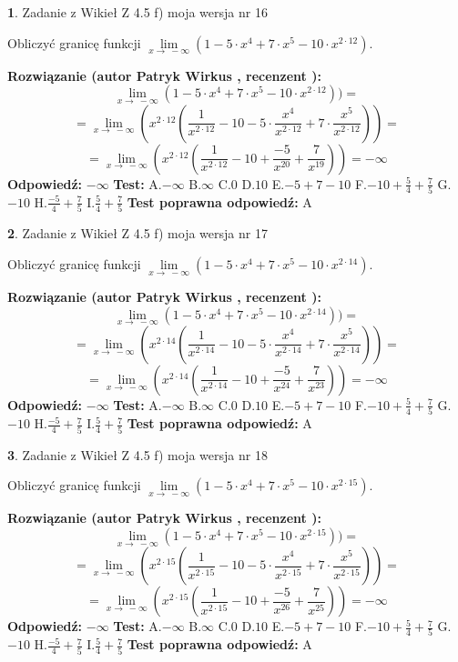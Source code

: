 \documentclass[12pt, a4paper]{article}
\theoremstyle{definition} %
\newtheorem{zad}{}
\newcommand{\zadStart}[1]{\begin{zad}#1\newline}
\newcommand{\zadStop}{\end{zad}}
\newcommand{\rozwStart}[2]{\noindent \textbf{Rozwiązanie (autor #1 , recenzent #2): }\newline}
\newcommand{\rozwStop}{\newline}
\newcommand{\odpStart}{\noindent \textbf{Odpowiedź:}\newline}
\newcommand{\odpStop}{\newline}
\newcommand{\testStart}{\noindent \textbf{Test:}\newline}
\newcommand{\testStop}{\newline}
\newcommand{\kluczStart}{\noindent \textbf{Test poprawna odpowiedź:}\newline}
\newcommand{\kluczStop}{\newline}
\begin{document}
\zadStart{Zadanie z Wikieł Z 4.5 f) moja wersja nr 16}



Obliczyć granicę funkcji  $\lim\limits_{x\to\ -\infty}(1 - 5 \cdot x^{4}+7 \cdot x^{5}- 10 \cdot x^{2\cdot12})$.
\zadStop
\rozwStart{Patryk Wirkus}{}
$$\lim\limits_{x\to\ -\infty}(1 - 5 \cdot x^{4}+7 \cdot x^{5}- 10 \cdot x^{2\cdot12}))=$$
$$=\lim\limits_{x\to\ -\infty}(x^{2\cdot12}(\frac{1}{x^{2\cdot12}}-10 -5 \cdot \frac{x^{4}}{x^{2\cdot12}}+7 \cdot \frac{x^{5}}{x^{2\cdot12}}))=$$
$$=\lim\limits_{x\to\ -\infty}(x^{2\cdot12}(\frac{1}{x^{2\cdot12}}-10 + \frac{-5}{x^{20}}+ \frac{7}{x^{19}}))=-\infty$$
\rozwStop
\odpStart
$-\infty$
\odpStop
\testStart
A.$-\infty$ B.$\infty$ C.$0$ D.$10$ E.$-5 + 7 - 10$
F.$-10+\frac{5}{4}+\frac{7}{5}$ G.$-10$
H.$\frac{-5}{4}+\frac{7}{5}$
I.$\frac{5}{4}+\frac{7}{5}$
\testStop
\kluczStart
A
\kluczStop



\zadStart{Zadanie z Wikieł Z 4.5 f) moja wersja nr 17}



Obliczyć granicę funkcji  $\lim\limits_{x\to\ -\infty}(1 - 5 \cdot x^{4}+7 \cdot x^{5}- 10 \cdot x^{2\cdot14})$.
\zadStop
\rozwStart{Patryk Wirkus}{}
$$\lim\limits_{x\to\ -\infty}(1 - 5 \cdot x^{4}+7 \cdot x^{5}- 10 \cdot x^{2\cdot14}))=$$
$$=\lim\limits_{x\to\ -\infty}(x^{2\cdot14}(\frac{1}{x^{2\cdot14}}-10 -5 \cdot \frac{x^{4}}{x^{2\cdot14}}+7 \cdot \frac{x^{5}}{x^{2\cdot14}}))=$$
$$=\lim\limits_{x\to\ -\infty}(x^{2\cdot14}(\frac{1}{x^{2\cdot14}}-10 + \frac{-5}{x^{24}}+ \frac{7}{x^{23}}))=-\infty$$
\rozwStop
\odpStart
$-\infty$
\odpStop
\testStart
A.$-\infty$ B.$\infty$ C.$0$ D.$10$ E.$-5 + 7 - 10$
F.$-10+\frac{5}{4}+\frac{7}{5}$ G.$-10$
H.$\frac{-5}{4}+\frac{7}{5}$
I.$\frac{5}{4}+\frac{7}{5}$
\testStop
\kluczStart
A
\kluczStop



\zadStart{Zadanie z Wikieł Z 4.5 f) moja wersja nr 18}



Obliczyć granicę funkcji  $\lim\limits_{x\to\ -\infty}(1 - 5 \cdot x^{4}+7 \cdot x^{5}- 10 \cdot x^{2\cdot15})$.
\zadStop
\rozwStart{Patryk Wirkus}{}
$$\lim\limits_{x\to\ -\infty}(1 - 5 \cdot x^{4}+7 \cdot x^{5}- 10 \cdot x^{2\cdot15}))=$$
$$=\lim\limits_{x\to\ -\infty}(x^{2\cdot15}(\frac{1}{x^{2\cdot15}}-10 -5 \cdot \frac{x^{4}}{x^{2\cdot15}}+7 \cdot \frac{x^{5}}{x^{2\cdot15}}))=$$
$$=\lim\limits_{x\to\ -\infty}(x^{2\cdot15}(\frac{1}{x^{2\cdot15}}-10 + \frac{-5}{x^{26}}+ \frac{7}{x^{25}}))=-\infty$$
\rozwStop
\odpStart
$-\infty$
\odpStop
\testStart
A.$-\infty$ B.$\infty$ C.$0$ D.$10$ E.$-5 + 7 - 10$
F.$-10+\frac{5}{4}+\frac{7}{5}$ G.$-10$
H.$\frac{-5}{4}+\frac{7}{5}$
I.$\frac{5}{4}+\frac{7}{5}$
\testStop
\kluczStart
A
\kluczStop
\end{document}
